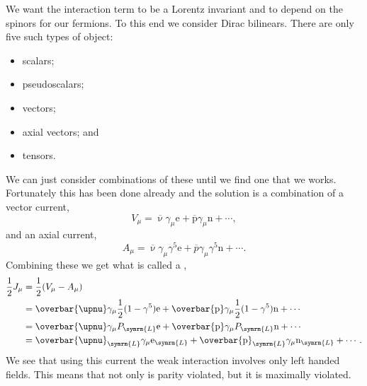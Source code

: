 \documentclass[fleqn]{NotesClass}
\newcommand{\Pparticle}[1]{\mathrm{#1}}
\newcommand{\Pex}{\ensuremath{\Pparticle{e}}}
\newcommand{\Pnu}{\ensuremath{\upnu}}
\newcommand{\Pp}{\ensuremath{\Pparticle{p}}}
\newcommand{\Pn}{\ensuremath{\Pparticle{n}}}
\newcommand{\diracadjoint}[1]{\overbar{#1}}
\newcommand{\Left}{\symrm{L}}
\begin{document}
    We want the interaction term to be a Lorentz invariant and to depend on the spinors for our fermions.
    To this end we consider Dirac bilinears.
    There are only five such types of object:
    \begin{itemize}
        \item scalars;
        \item pseudoscalars;
        \item vectors;
        \item axial vectors; and
        \item tensors.
    \end{itemize}
    We can just consider combinations of these until we find one that we works.
    Fortunately this has been done already and the solution is a combination of a vector current,
    \begin{equation}
        V_\mu = \diracadjoint{\Pnu}\gamma_\mu \Pex + \diracadjoint{\Pp} \gamma_\mu \Pn + \dotsb,
    \end{equation}
    and an axial current,
    \begin{equation}
        A_\mu = \diracadjoint{\Pnu} \gamma_\mu \gamma^5 \Pex + \diracadjoint{p} \gamma_\mu \gamma^5 \Pn + \dotsb.
    \end{equation}
    Combining these we get what is called a ,
    \begin{align}
        \frac{1}{2}J_\mu &= \frac{1}{2}(V_\mu - A_\mu)\\
        &= \diracadjoint{\Pnu}\gamma_\mu \frac{1}{2}(1 - \gamma^5) \Pex + \diracadjoint{\Pp}\gamma_\mu \frac{1}{2}(1 - \gamma^5)\Pn + \dotsb\\
        &= \diracadjoint{\Pnu}\gamma_\mu P_{\Left} \Pex + \diracadjoint{\Pp}\gamma_\mu P_{\Left} \Pn + \dotsb\\
        &= \diracadjoint{\Pnu}_{\Left} \gamma_\mu \Pex_{\Left} + \diracadjoint{\Pp}_{\Left} \gamma_\mu \Pn_{\Left} + \dotsb.
    \end{align}
    We see that using this current the weak interaction involves only left handed fields.
    This means that not only is parity violated, but it is maximally violated.
    
\end{document}
